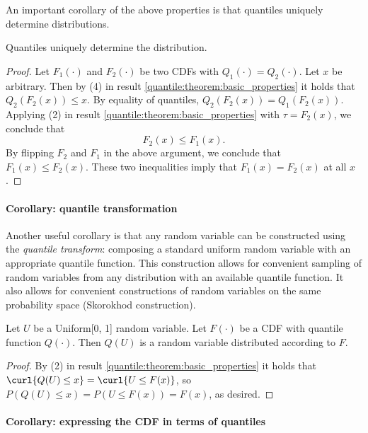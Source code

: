  An important corollary of the above properties is that quantiles uniquely determine distributions.
 \begin{cl}
 	Quantiles uniquely determine the distribution.
 \end{cl}
 
 \begin{proof}
 	Let $F_1(\cdot)$ and $F_2(\cdot)$ be two CDFs with $Q_1(\cdot) = Q_2(\cdot)$. 
 	Let $x$ be arbitrary.  Then by (4) in result \ref{quantile:theorem:basic_properties} it holds that 
 	$Q_2(F_2(x)) \leq x$. By equality of quantiles, $Q_2(F_2(x))=Q_1(F_2(x))$. Applying (2) in result \ref{quantile:theorem:basic_properties} with $\tau = F_2(x)$, we conclude that 
 	\begin{equation}
 		 F_2(x) \leq F_1(x).
 	\end{equation}
 By flipping $F_2$ and $F_1$ in the above argument, we conclude that $F_1(x)\leq F_2(x)$. These two inequalities imply that $F_1(x)= F_2(x)$ at all $x$.
 \end{proof}
 

 \paragraph{Corollary: quantile transformation}
 
 
 Another useful corollary is that any random variable can be constructed using the \emph{quantile transform}: composing a standard uniform random variable with an appropriate quantile function.
 This construction allows for convenient sampling of random variables from any distribution with an available quantile function.
 It also allows for convenient constructions of random variables on the same probability space (Skorokhod construction).
 \begin{cl}
 	\label{quantile:theorem:quantileTransform}  
 	
 Let $U$ be  a Uniform[0, 1] random variable.  Let $F(\cdot)$ be a CDF with quantile function $Q(\cdot)$. Then $Q(U)$ is a random variable distributed according to $F$. 
 \end{cl}
 
 
 
 \begin{proof}
 By (2) in result \ref{quantile:theorem:basic_properties} it holds that 
 $\curl{Q(U)\leq x} = \curl{U\leq F(x) }$, so $P(Q(U)\leq x) = P(U\leq F(x))= F(x)$, as desired. 
 \end{proof}
 
 
  \paragraph{Corollary: expressing the CDF in terms of quantiles}
 
